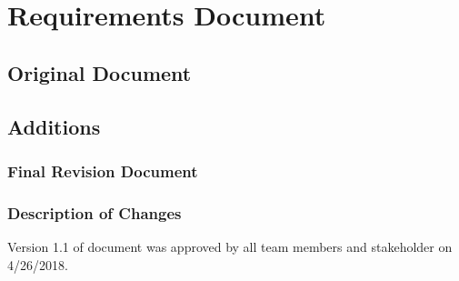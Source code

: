 \section{Requirements Document}
\subsection{Original Document}


\subsection{Additions}
\subsubsection{Final Revision Document}


\subsubsection{Description of Changes}
Version 1.1 of document was approved by all team members and stakeholder on 4/26/2018.

